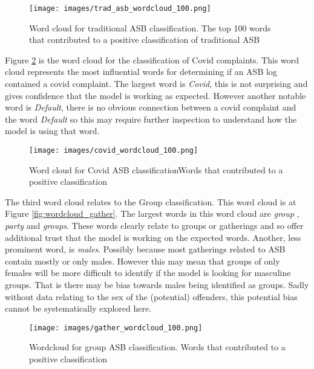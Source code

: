 \begin{figure}[h]
    \texttt{[image: images/trad\_asb\_wordcloud\_100.png]}
    \caption[Word cloud for traditional ASB classification.]{{Word cloud for traditional ASB classification.} The top 100 words that contributed to a positive classification of traditional ASB}
    \label{fig: wordcloud_trad}
\end{figure}

Figure \ref{fig: wordcloud_covid} is the word cloud for the classification of Covid complaints. This word cloud represents the most influential words for determining if an ASB log contained a covid complaint. The largest word is \emph{Covid}, this is not surprising and gives confidence that the model is working as expected. However another notable word is \emph{Default}, there is no obvious connection between a covid complaint and the word \emph{Default}  so this may require further inspection to understand how the model is using that word.


\begin{figure}[h]
    \centering
    \texttt{[image: images/covid\_wordcloud\_100.png]}
    \caption[Word cloud for Covid ASB classification]{{Word cloud for Covid ASB classification}Words that contributed to a positive classification}
    \label{fig: wordcloud_covid}
\end{figure}

The third word cloud relates to the Group classification. This word cloud is at Figure \ref{fig:wordcloud_gather}. The largest words in this word cloud are \emph{group} , \emph{party} and \emph{groups}. These words clearly relate to groups or gatherings and so offer additional trust that the model is working on the expected words. Another, less prominent word, is \emph{males}. Possibly because most gatherings related to ASB contain mostly or only males. However this may mean that groups of only females will be more difficult to identify if the model is looking for masculine groups. That is there may be bias towards males being identified as groups. Sadly without data relating to the sex of the (potential) offenders, this potential bias cannot be systematically explored here. 


\begin{figure}[h]
    \texttt{[image: images/gather\_wordcloud\_100.png]}
    \caption[Wordcloud for group ASB classification.]{{Wordcloud for group ASB classification.} Words that contributed to a positive classification}
    \label{fig: wordcloud_gather}
\end{figure}
   


